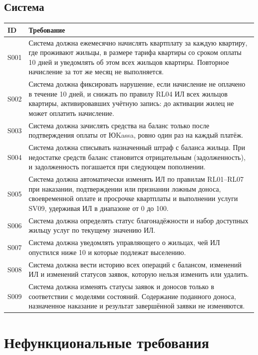 \documentclass[12pt,a4paper]{article}
\newenvironment{reqtable}{%
  \begin{longtable}{L{14mm} L{146mm}}
  \toprule
  \textbf{ID} & \textbf{Требование} \\
  \midrule
  \endhead
  \bottomrule
  \endfoot
}{\end{longtable}}
\begin{document}
\subsection{Система}
\begin{reqtable}
S001 & Система должна ежемесячно начислять квартплату за каждую квартиру, где проживают жильцы, в размере тарифа квартиры со сроком оплаты 10 дней и уведомлять об этом всех жильцов квартиры. Повторное начисление за тот же месяц не выполняется. \\
S002 & Система должна фиксировать нарушение, если начисление не оплачено в течение 10 дней, и снижать по правилу RL04 ИЛ всех жильцов квартиры, активировавших учётную запись: до активации жилец не может оплатить начисление. \\
S003 & Система должна зачислять средства на баланс только после подтверждения оплаты от ЮKassa, ровно один раз на каждый платёж. \\
S004 & Система должна списывать назначенный штраф с баланса жильца. При недостатке средств баланс становится отрицательным (задолженность), и задолженность погашается при следующем пополнении. \\
S005 & Система должна автоматически изменять ИЛ по правилам RL01--RL07 при наказании, подтверждении или признании ложным доноса, своевременной оплате и просрочке квартплаты и выполнении услуги SV09, удерживая ИЛ в диапазоне от 0 до 100. \\
S006 & Система должна определять статус благонадёжности и набор доступных жильцу услуг по текущему значению ИЛ. \\
S007 & Система должна уведомлять управляющего о жильцах, чей ИЛ опустился ниже 10 и которые подлежат выселению. \\
S008 & Система должна вести историю всех операций с балансом, изменений ИЛ и изменений статусов заявок, которую нельзя изменить или удалить. \\
S009 & Система должна изменять статусы заявок и доносов только в соответствии с моделями состояний. Содержание поданного доноса, назначенное наказание и результат завершённой заявки не изменяются. \\
\end{reqtable}

\section{Нефункциональные требования}
\end{document}
